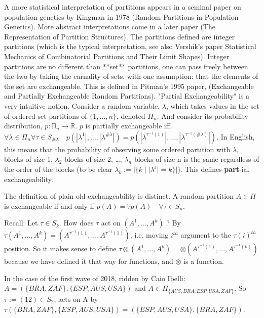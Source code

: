 \documentclass{article}
\theoremstyle{definition}
\begin{document}
A more statistical interpretation of partitions appears in a seminal paper on population genetics by Kingman in 1978 (Random Partitions in Population Genetics). More abstract interpretations come in a later paper (The Representation of Partition Structures). The partitions defined are integer partitions (which is the typical interpretation, see also Vershik's paper Statistical Mechanics of Combinatorial Partitions and Their Limit Shapes). Integer partitions are no different than **set** partitions, one can pass freely between the two by taking the carnality of sets, with one assumption: that the elements of the set are exchangeable. This is defined in Pitman's 1995 paper, (Exchangeable and Partially Exchangeable Random Partitions). "Partial Exchangeability" is a very intuitive notion. Consider a random variable, $\lambda$, which takes values in the set of ordered set partitions of $\{1,\dots,n\}$, denoted $\Pi_n$. And consider its probability distribution, $p:\mathbb{\Pi}_n\rightarrow\mathbb{R}$.  $p$ is partially exchangeable iff. $\forall \lambda \in \Pi_n \forall \tau \in S_{\#\lambda} \quad p(|\lambda^{1}|,\dots,|\lambda^{\#\lambda}|) = p(|\lambda^{\tau^{-1}(1)}|,\dots, |\lambda^{\tau^{-1}(\#\lambda)}|)$. In English, this means that the probability of observing some ordered partition with $\lambda_1$ blocks of size 1, $\lambda_2$ blocks of size 2, …, $\lambda_n$ blocks of size n is the same regardless of the order of the blocks (to be clear $\lambda_k := |\{k \mid  |\lambda^j| = k \}|$). This defines \textbf{part}-ial exchangeability.

The definition of plain old exchangeability is distinct. A random partition $A \in \Pi$ is exchangeable if and only if $p(A) = \hat{\tau}p(A) \quad \forall \tau\in S_n$.

Recall:
Let $\tau \in S_k$. How does $\tau$ act on $(A^{1},\dots,A^{k})$ ? By $\tau(A^{1},…,A^{k}) = (A^{\tau^{-1}(1)},\dots,A^{\tau^{-1}(1)})$, i.e. moving $i^{th}$ argument to the $\tau(i)^{th}$ position. So it makes sense to define $\tau\otimes(A^{1},\dots,A^{k}) = \otimes(A^{\tau^{-1}(1)},\dots,A^{\tau^{-1}(k)})$ because we have defined it that way for functions, and $\otimes$ is a function.

In the case of the first wave of 2018, ridden by Caio Ibelli: $A=(\{BRA, ZAF\},\{ESP, AUS, USA\})$ and $A \in \Pi_{\{AUS,BRA,ESP,USA,ZAF\}}$. So $\tau:=(1 2)\in S_2$, acts on A by $\tau(\{BRA, ZAF\},\{ESP, AUS, USA\}) = (\{ESP, AUS, USA\},\{BRA, ZAF\})$.
\end{document}
